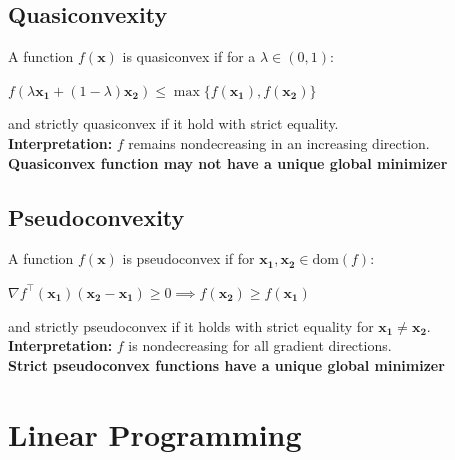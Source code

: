 \documentclass[english]{latex4ei/latex4ei_sheet}
\begin{document}
\begin{sectionbox}
	\subsection{Quasiconvexity}
	A function $f(\bm{x})$ is quasiconvex if for a $\lambda \in (0, 1)$:
	\begin{center}
		$f(\lambda \bm{x_1} + (1-\lambda)\bm{x_2}) \leq \max\{f(\bm{x_1}), f(\bm{x_2})\}$
	\end{center}
	and strictly quasiconvex if it hold with strict equality. \\
	\textbf{Interpretation:} $f$ remains nondecreasing in an increasing direction. \\
	\textbf{Quasiconvex function may not have a unique global minimizer}
	\vspace{0.5em}
	
	\subsection{Pseudoconvexity}
	A function $f(\bm{x})$ is pseudoconvex if for $\bm{x_1}, \bm{x_2} \in \text{dom}(f)$:
	\begin{center}
		$\nabla f^\intercal(\bm{x_1})(\bm{x_2} - \bm{x_1}) \geq 0 \implies f(\bm{x_2}) \geq f(\bm{x_1})$
	\end{center}
	and strictly pseudoconvex if it holds with strict equality for $\bm{x_1} \neq \bm{x_2}$. \\
	\textbf{Interpretation:} $f$ is nondecreasing for all gradient directions. \\
	\textbf{Strict pseudoconvex functions have a unique global minimizer}
\end{sectionbox}

\section{Linear Programming}
\end{document}
